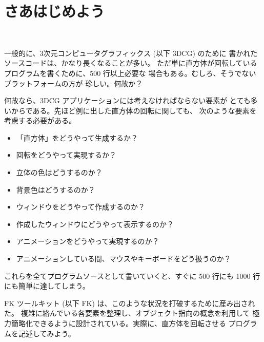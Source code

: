 \chapter{さあはじめよう} \label{chap:intro} ~

一般的に、3次元コンピュータグラフィックス (以下 3DCG) のために
書かれたソースコードは、かなり長くなることが多い。
ただ単に直方体が回転しているプログラムを書くために、500 行以上必要な
場合もある。むしろ、そうでないプラットフォームの方が
珍しい。何故か？

何故なら、3DCG アプリケーションには考えなければならない要素が
とても多いからである。先ほど例に出した直方体の回転に関しても、
次のような要素を考慮する必要がある。
\begin{itemize}
 \item 「直方体」をどうやって生成するか？
 \item 回転をどうやって実現するか？
 \item 立体の色はどうするのか？
 \item 背景色はどうするのか？
 \item ウィンドウをどうやって作成するのか？
 \item 作成したウィンドウにどうやって表示するのか？
 \item アニメーションをどうやって実現するのか？
 \item アニメーションしている間、マウスやキーボードをどう扱うのか？
\end{itemize}
これらを全てプログラムソースとして書いていくと、すぐに 500 行にも
1000 行にも簡単に達してしまう。

FK ツールキット (以下 FK) は、このような状況を打破するために産み出された。
複雑に絡んでいる各要素を整理し、オブジェクト指向の概念を利用して
極力簡略化できるように設計されている。実際に、直方体を回転させる
プログラムを記述してみよう。
